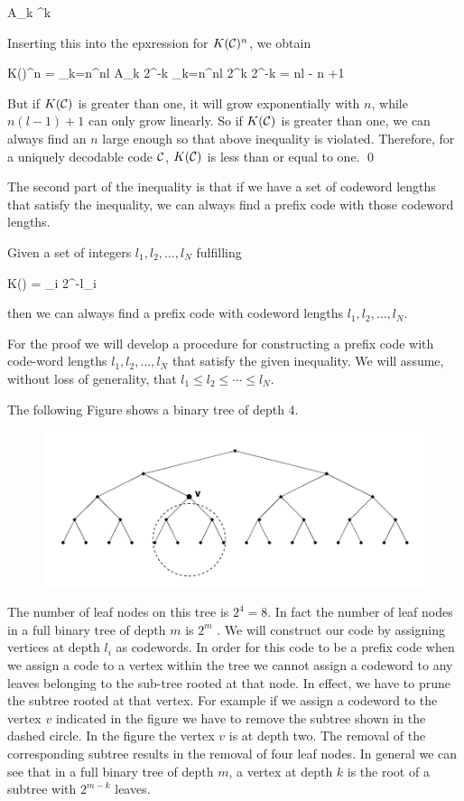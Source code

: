 \bee
A_k ^k
\eee

Inserting this into the epxression for $K(\mathcal{C})^n$, we obtain

\bee
K(\Cc)^n = \sum_{k=n}^{nl} A_k 2^{-k} \leq \sum_{k=n}^{nl} 2^k 2^{-k} = nl - n +1
\eee

But if $K(\mathcal{C})$ is greater than one, it will grow exponentially with $n$, while $n(l − 1) + 1$ can only grow linearly. So if $K(\mathcal{C})$ is greater than one, we can always find an $n$ large enough so that above inequality is violated. Therefore, for a uniquely decodable code $\mathcal{C}$, $K(\mathcal{C})$ is less than or equal to one. \qed


The second part of the inequality is that if we have a set of codeword lengths that satisfy the inequality, we can always find a prefix code with those codeword lengths.


Given a set of integers $l_1, l_2, \ldots, l_N$ fulfilling

\bee
    K(\Cc) = \sum_i 2^{-l_i} 
\eee

then we can always find a prefix code with codeword lengths $l_1, l_2, \ldots, l_N$.

For the proof we will develop a procedure for constructing a prefix code with code-word lengths $l_1 , l_2, \ldots, l_N$ that satisfy the given inequality. We will assume, without loss of generality, that $l_1 \leq l_2 \leq \cdots \leq l_N$. 


The following Figure shows a binary tree of depth $4$. 

\begin{figure}[H]
    \centering
    \includegraphics[scale=0.4]{images/2021-04-26-tree.png}
\end{figure}

The number of leaf nodes on this tree is $2^4 = 8$. In fact the number of leaf nodes in a full binary tree of depth $m$ is $2^m$ . We will construct our code by assigning vertices at depth $l_i$ as codewords. In order for this code to be a prefix code when we assign a code to a vertex within the tree we cannot assign a codeword to any leaves belonging to the sub-tree rooted at that node. In effect, we have to prune the subtree rooted at that vertex. For example if we assign a codeword to the vertex $v$ indicated in the figure we have to remove the subtree shown in the dashed circle. In the figure the vertex $v$ is at depth two. The removal of the corresponding subtree results in the removal of four leaf nodes. In general we can see that in a full binary tree of depth $m$, a vertex at depth $k$ is the root of a subtree with $2^{m−k}$ leaves.

